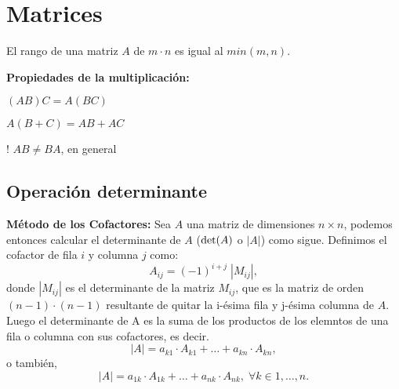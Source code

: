 


\section{Matrices}
\begin{definition}
    El rango de una matriz $A$ de $m \cdot n$ es igual al $min(m, n)$.
\end{definition}
\textbf{Propiedades de la multiplicación:}
\begin{bangenumerate}
    \item $(AB)C = A(BC)$
    \item $A(B+C)= AB + AC$
    \item! $AB \neq BA$, en general
\end{bangenumerate}
\subsection{Operación determinante}
\begin{definition}
    \textbf{Método de los Cofactores:} Sea $A$ una matriz de dimensiones $n \times n$, 
    podemos entonces calcular el determinante de $A$ ($\determinant(A)$ o $|A|$) como sigue.
    Definimos el cofactor de fila $i$ y columna $j$ como:
    \begin{equation*}
        A_{ij} = (-1)^{i+j} \; |M_{ij}|,
    \end{equation*}
    donde $|M_{ij}|$ es el determinante de la matriz $M_{ij}$, que es la matriz de orden $(n-1)\cdot(n-1)$ resultante
    de quitar la i-ésima fila y j-ésima columna de $A$. Luego el determinante de A es la suma de los productos de los
    elemntos de una fila o columna con sus cofactores, es decir.
    \begin{equation*}
        |A| = a_{k1} \cdot A_{k1} + \dots + a_{kn} \cdot A_{kn},
    \end{equation*}
    o también,
    \begin{equation*}
        |A| = a_{1k} \cdot A_{1k} + \dots + a_{nk}\cdot A_{nk}, \; \forall k \in {1, \dots, n}.
    \end{equation*}
\end{definition}

